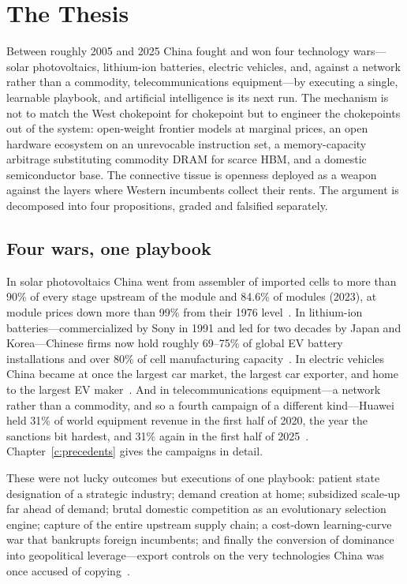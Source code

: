 \chapter{The Thesis}
\label{c:thesis}

\begin{glance}
Between roughly 2005 and 2025 China fought and won four technology wars---solar photovoltaics, lithium-ion batteries, electric vehicles, and, against a network rather than a commodity, telecommunications equipment---by executing a single, learnable playbook, and artificial intelligence is its next run. The mechanism is not to match the West chokepoint for chokepoint but to engineer the chokepoints out of the system: open-weight frontier models at marginal prices, an open hardware ecosystem on an unrevocable instruction set, a memory-capacity arbitrage substituting commodity DRAM for scarce HBM, and a domestic semiconductor base. The connective tissue is openness deployed as a weapon against the layers where Western incumbents collect their rents. The argument is decomposed into four propositions, graded and falsified separately.
\end{glance}

\section{Four wars, one playbook}

In solar photovoltaics China went from assembler of imported cells to more than 90\% of every stage upstream of the module and 84.6\% of modules (2023), at module prices down more than 99\% from their 1976 level~\cite{owid-learning,pv-shares-2023}. In lithium-ion batteries---commercialized by Sony in 1991 and led for two decades by Japan and Korea---Chinese firms now hold roughly 69--75\% of global EV battery installations and over 80\% of cell manufacturing capacity~\cite{sne-2025,bnef-2025}. In electric vehicles China became at once the largest car market, the largest car exporter, and home to the largest EV maker~\cite{rhodium-evs,caam-2025}. And in telecommunications equipment---a network rather than a commodity, and so a fourth campaign of a different kind---Huawei held 31\% of world equipment revenue in the first half of 2020, the year the sanctions bit hardest, and 31\% again in the first half of 2025~\cite{delloro-huawei}. Chapter~\ref{c:precedents} gives the campaigns in detail.

These were not lucky outcomes but executions of one playbook: patient state designation of a strategic industry; demand creation at home; subsidized scale-up far ahead of demand; brutal domestic competition as an evolutionary selection engine; capture of the entire upstream supply chain; a cost-down learning-curve war that bankrupts foreign incumbents; and finally the conversion of dominance into geopolitical leverage---export controls on the very technologies China was once accused of copying~\cite{mofcom-battery-controls,csis-rare-earth}.

